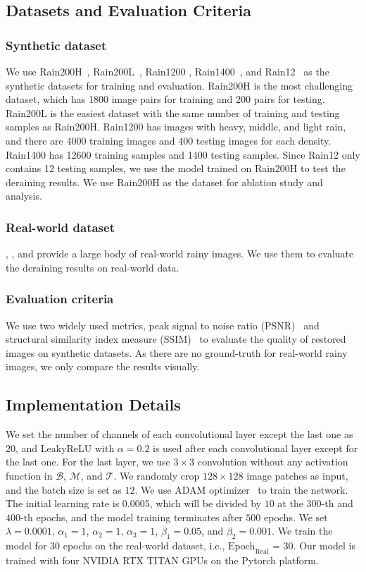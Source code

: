 \documentclass[letterpaper]{article} %
\begin{document}
\subsection{Datasets and Evaluation Criteria}
\subsubsection{Synthetic dataset}
We use Rain200H~\cite{derain_jorder_yang}, Rain200L~\cite{derain_jorder_yang},
Rain1200 \cite{derain_zhang_did},
Rain1400~\cite{derain_ddn_fu}, and
Rain12~\cite{derain_lp_li} as the synthetic datasets for training and evaluation.
{Rain200H} is the most challenging dataset, which has 1800 image pairs for training and 200 pairs for testing.
{Rain200L} is the easiest dataset with the same number of training and testing samples as Rain200H.
{Rain1200} has images with heavy, middle, and light rain, and there are 4000 training images and 400 testing images for each density.
{Rain1400} has 12600 training samples and 1400 testing samples.
Since {Rain12} only contains 12 testing samples, we use the model trained on Rain200H to test the deraining results.
We use Rain200H as the dataset for ablation study and analysis.


\subsubsection{Real-world dataset}
\citet{derain_jorder_yang}, \citet{deraining-benchmark-analysis}, and \citet{mm20_wang_jdnet} provide a large body of real-world rainy images. We use them to evaluate the deraining results on real-world data.
\subsubsection{Evaluation criteria}
We use two widely used metrics, peak signal to noise ratio (PSNR)~\cite{PSNR_thu} and structural similarity index measure (SSIM)~\cite{SSIM_wang} to evaluate the quality of restored images on synthetic datasets.
As there are no ground-truth for real-world rainy images, we only compare the results visually.
\subsection{Implementation Details}
We set the number of channels of each convolutional layer except the last one as $20$, and LeakyReLU with $\alpha = 0.2$ is used after each convolutional layer except for the last one.
For the last layer, we use $3 \times 3$ convolution without any activation function in $\mathcal{B}$, $\mathcal{M}$, and $\mathcal{T}$.
We randomly crop $128\times128$ image patches as input, and the batch size is set as $12$.
We use ADAM optimizer~\cite{adam} to train the network.
The initial learning rate is 0.0005, which will be divided by $10$ at the $300$-th and $400$-th epochs, and the model training terminates after $500$ epochs.
We set $\lambda=0.0001$, $\alpha_{1}=1$, $\alpha_{2}=1$,  $\alpha_{3}=1$,  $\beta_{1}=0.05$, and $\beta_{2}=0.001$.
We train the model for 30 epochs on the real-world dataset, i.e., $\mathrm{Epoch}_{\mathrm{Real}}$ = 30.
Our model is trained with four NVIDIA RTX TITAN GPUs on the Pytorch platform.
\end{document}
